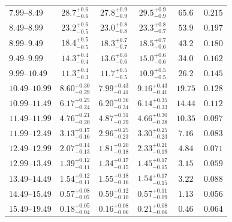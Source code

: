 \documentclass[aps,prd,reprint,superscriptaddress,floatfix,altaffilletter,nofootinbib]{revtex4-2}
\begin{document}
\begin{table}[h]
\begin{center}
\begin{tabular}{l@{\quad}ccc@{\quad}cr}
$7.99$--$8.49$ & $  28.7^{ +0.6}_{ -0.6}$ & $  27.8^{ +0.9}_{ -0.9}$ & $  29.5^{ +0.9}_{ -0.9}$ & $   65.6$ & $  0.215$ \\
$8.49$--$8.99$ & $  23.2^{ +0.6}_{ -0.5}$ & $  23.0^{ +0.8}_{ -0.8}$ & $  23.3^{ +0.8}_{ -0.7}$ & $   53.9$ & $  0.197$ \\
$8.99$--$9.49$ & $  18.4^{ +0.5}_{ -0.5}$ & $  18.3^{ +0.7}_{ -0.7}$ & $  18.5^{ +0.7}_{ -0.6}$ & $   43.2$ & $  0.180$ \\
$9.49$--$9.99$ & $  14.3^{ +0.4}_{ -0.4}$ & $  13.6^{ +0.6}_{ -0.6}$ & $  15.0^{ +0.6}_{ -0.6}$ & $   34.0$ & $  0.162$ \\
$9.99$--$10.49$ & $  11.3^{ +0.4}_{ -0.3}$ & $  11.7^{ +0.5}_{ -0.5}$ & $  10.9^{ +0.5}_{ -0.5}$ & $   26.2$ & $  0.145$ \\
$10.49$--$10.99$ & $8.60^{+0.30}_{-0.29}$ & $7.99^{+0.43}_{-0.41}$ & $9.16^{+0.43}_{-0.41}$ & $  19.75$ & $  0.128$ \\
$10.99$--$11.49$ & $6.17^{+0.25}_{-0.24}$ & $6.20^{+0.36}_{-0.34}$ & $6.14^{+0.35}_{-0.33}$ & $  14.44$ & $  0.112$ \\
$11.49$--$11.99$ & $4.76^{+0.21}_{-0.20}$ & $4.87^{+0.31}_{-0.29}$ & $4.66^{+0.30}_{-0.28}$ & $  10.35$ & $  0.097$ \\
$11.99$--$12.49$ & $3.13^{+0.17}_{-0.16}$ & $2.96^{+0.25}_{-0.23}$ & $3.30^{+0.25}_{-0.23}$ & $   7.16$ & $  0.083$ \\
$12.49$--$12.99$ & $2.07^{+0.14}_{-0.13}$ & $1.81^{+0.20}_{-0.18}$ & $2.33^{+0.21}_{-0.19}$ & $   4.84$ & $  0.071$ \\
$12.99$--$13.49$ & $1.39^{+0.12}_{-0.11}$ & $1.34^{+0.17}_{-0.15}$ & $1.45^{+0.17}_{-0.15}$ & $   3.15$ & $  0.059$ \\
$13.49$--$14.49$ & $1.54^{+0.12}_{-0.11}$ & $1.55^{+0.18}_{-0.16}$ & $1.54^{+0.17}_{-0.15}$ & $   3.22$ & $  0.088$ \\
$14.49$--$15.49$ & $0.57^{+0.08}_{-0.07}$ & $0.59^{+0.12}_{-0.10}$ & $0.57^{+0.11}_{-0.09}$ & $   1.13$ & $  0.056$ \\
$15.49$--$19.49$ & $0.18^{+0.05}_{-0.04}$ & $0.16^{+0.08}_{-0.06}$ & $0.21^{+0.08}_{-0.06}$ & $   0.46$ & $  0.064$ \\
\hline\hline
\end{tabular}
\end{center}
\end{table}
\end{document}
